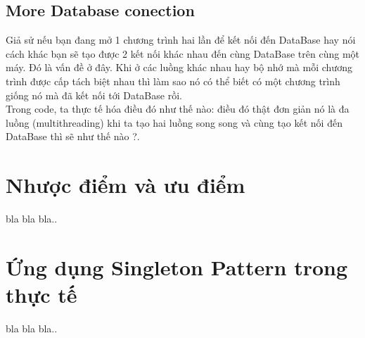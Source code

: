 \subsection{More Database conection}
Giả sử nếu bạn đang mở 1 chương trình hai lần để kết nối đến DataBase hay nói cách khác bạn sẽ tạo được 2 kết nối khác nhau đến cùng DataBase trên cùng một máy. Đó là vấn đề ở đây. Khi ở các luồng khác nhau hay bộ nhớ mà mỗi chương trình được cấp tách biệt nhau thì làm sao nó có thể biết có một chương trình giống nó mà đã kết nối tới DataBase rồi.\\

Trong code, ta thực tế hóa điều đó như thế nào: điều đó thật đơn giản nó là đa luồng (multithreading) khi ta tạo hai luồng song song và cùng tạo kết nối đến DataBase thì sẽ như thế nào ?. \\

\section{Nhược điểm và ưu điểm}

bla bla bla..

\section{Ứng dụng Singleton Pattern trong thực tế}
bla bla bla..


